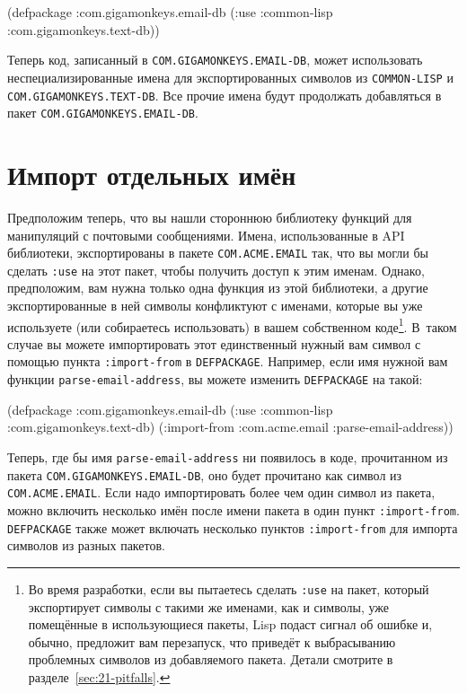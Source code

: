 \begin{myverb}
(defpackage :com.gigamonkeys.email-db
  (:use :common-lisp :com.gigamonkeys.text-db))
\end{myverb}

Теперь код, записанный в \lstinline{COM.GIGAMONKEYS.EMAIL-DB}, может использовать
неспециализированные имена для экспортированных символов из \lstinline{COMMON-LISP} и
\lstinline{COM.GIGAMONKEYS.TEXT-DB}. Все прочие имена будут продолжать добавляться в пакет
\lstinline{COM.GIGAMONKEYS.EMAIL-DB}.

\section{Импорт отдельных имён}

Предположим теперь, что вы нашли стороннюю библиотеку функций для манипуляций с почтовыми
сообщениями. Имена, использованные в API библиотеки, экспортированы в пакете
\lstinline{COM.ACME.EMAIL} так, что вы могли бы сделать \lstinline{:use} на этот пакет, чтобы
получить доступ к этим именам. Однако, предположим, вам нужна только одна функция из этой
библиотеки, а другие экспортированные в ней символы конфликтуют с именами, которые вы уже
используете (или собираетесь использовать) в вашем собственном коде\footnote{Во время
  разработки, если вы пытаетесь сделать \lstinline{:use} на пакет, который экспортирует символы
  с такими же именами, как и символы, уже помещённые в использующиеся пакеты, Lisp подаст
  сигнал об ошибке и, обычно, предложит вам перезапуск, что приведёт к выбрасыванию
  проблемных символов из добавляемого пакета. Детали смотрите в
  разделе~\ref{sec:21-pitfalls}.}\hspace{\footnotenegspace}. В~таком случае вы можете импортировать этот единственный
нужный вам символ с помощью пункта \lstinline{:import-from} в \lstinline{DEFPACKAGE}. Например, если
имя нужной вам функции \lstinline{parse-email-address}, вы можете изменить \lstinline{DEFPACKAGE} на
такой:

\begin{myverb}
(defpackage :com.gigamonkeys.email-db
  (:use :common-lisp :com.gigamonkeys.text-db)
  (:import-from :com.acme.email :parse-email-address))
\end{myverb}

Теперь, где бы имя \lstinline{parse-email-address} ни появилось в коде, прочитанном из пакета
\lstinline{COM.GIGAMONKEYS.EMAIL-DB}, оно будет прочитано как символ из
\lstinline{COM.ACME.EMAIL}. Если надо импортировать более чем один символ из пакета, можно
включить несколько имён после имени пакета в один пункт \lstinline{:import-from}.
\lstinline{DEFPACKAGE} также может включать несколько пунктов \lstinline{:import-from} для импорта
символов из разных пакетов.

